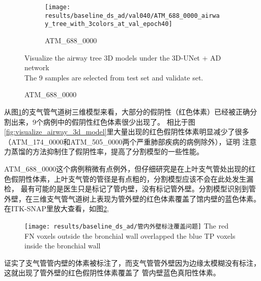 \begin{figure}[!htp]
    \hfill
    \begin{subfigure}{0.325\textwidth}
        \texttt{[image: results/baseline\_ds\_ad/val040/ATM\_688\_0000\_airway\_tree\_with\_3colors\_at\_val\_epoch40]}
        \caption{ATM\_688\_0000}
    \end{subfigure}
        {Visualize the airway tree 3D models under the 3D-UNet + AD network\\
        The 9 samples are selected from test set and validate set.}
    \label{fig:3dunetad_airway_tree}
\end{figure}

从图\ref{fig:3dunetad_airway_tree}的支气管气道树三维模型来看，大部分的假阴性（红色体素）已经被正确分割出来，9个病例中的假阴性红色体素很少出现了。
相比于图\ref{fig:visualize_airway_3d_model}里大量出现的红色假阴性体素明显减少了很多（ATM\_174\_0000和ATM\_505\_0000两个严重肺部疾病的病例除外），证明
注意力蒸馏的方法抑制住了假阴性率，提高了分割模型的一些性能。

ATM\_688\_0000这个病例稍微有点例外，但仔细研究是在上叶支气管处出现的红色假阴性体素，上叶支气管的管径是有点粗的，分割模型应该不会在此处发生漏检，
最有可能的是医生只是标记了管内壁，没有标记管外壁。分割模型识别到管外壁，在三维支气管气道树上表现为管外壁的红色体素覆盖了馆内壁的蓝色体素。
在ITK-SNAP里放大查看，如图\ref{fig:annotation_overlap},
\begin{figure}[h]
    \centering
    \texttt{[image: results/baseline\_ds\_ad/管内外壁标注覆盖问题]}
    	{The red FN voxels outside the bronchial wall overlapped the blue TP voxels inside the bronchial wall}
    \label{fig:annotation_overlap}
\end{figure}
证实了支气管管内壁的体素被标注了，而支气管管外壁因为边缘太模糊没有标注，这就出现了管外壁的红色假阴性体素覆盖了
管内壁蓝色真阳性体素。

